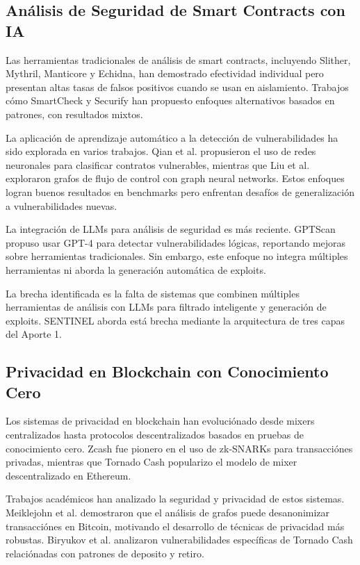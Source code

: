 \documentclass[12pt,a4paper,twoside]{book}
\begin{document}
\subsection{Análisis de Seguridad de Smart Contracts con IA}

Las herramientas tradicionales de análisis de smart contracts, incluyendo Slither, Mythril, Manticore y Echidna, han demostrado efectividad individual pero presentan altas tasas de falsos positivos cuando se usan en aislamiento. Trabajos cómo SmartCheck y Securify han propuesto enfoques alternativos basados en patrones, con resultados mixtos.

La aplicación de aprendizaje automático a la detección de vulnerabilidades ha sido explorada en varios trabajos. Qian et al. propusieron el uso de redes neuronales para clasificar contratos vulnerables, mientras que Liu et al. exploraron grafos de flujo de control con graph neural networks. Estos enfoques logran buenos resultados en benchmarks pero enfrentan desafíos de generalización a vulnerabilidades nuevas.

La integración de LLMs para análisis de seguridad es más reciente. GPTScan propuso usar GPT-4 para detectar vulnerabilidades lógicas, reportando mejoras sobre herramientas tradicionales. Sin embargo, este enfoque no integra múltiples herramientas ni aborda la generación automática de exploits.

La brecha identificada es la falta de sistemas que combinen múltiples herramientas de análisis con LLMs para filtrado inteligente y generación de exploits. SENTINEL aborda está brecha mediante la arquitectura de tres capas del Aporte 1.

\subsection{Privacidad en Blockchain con Conocimiento Cero}

Los sistemas de privacidad en blockchain han evoluciónado desde mixers centralizados hasta protocolos descentralizados basados en pruebas de conocimiento cero. Zcash fue pionero en el uso de zk-SNARKs para transacciónes privadas, mientras que Tornado Cash popularizo el modelo de mixer descentralizado en Ethereum.

Trabajos académicos han analizado la seguridad y privacidad de estos sistemas. Meiklejohn et al. demostraron que el análisis de grafos puede desanonimizar transacciónes en Bitcoin, motivando el desarrollo de técnicas de privacidad más robustas. Biryukov et al. analizaron vulnerabilidades específicas de Tornado Cash relaciónadas con patrones de deposito y retiro.
\end{document}
